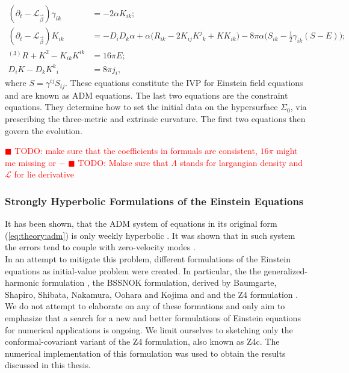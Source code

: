 \documentclass[11pt,a4paper,headinclude=true,DIV=14,BCOR=8mm,chapterprefix,listof=totoc,twoside,openright,abstracton]{scrbook}
\newcommand{\todo}[1]{\textcolor{red}{$\blacksquare$ TODO: #1}}
\begin{document}
\begin{align}
    (\partial_t - \mathcal{L}_{\vec{\beta}})\gamma_{ik} &= -2\alpha K_{ik}; \\
    (\partial_t - \mathcal{L}_{\vec{\beta}})K_{ik} &= -D_{i}D_{k}\alpha + \alpha\big(R_{ik} - 2K_{ij}{K^j}_k+KK_{ik}\big) - 8\pi\alpha\big(S_{ik} - \frac{1}{2}\gamma_{ik}(S-E)\big); \\
    {^{(3)}R} + K^2 - K_{ik}K^{ik} &= 16\pi E; \\
    D_{i}K-D_{k}{K^k}_i &= 8\pi j_i,
    \label{eq:theory:adm}
\end{align}
where $S = \gamma^{ij}S_{ij}$.
These equations constitute the IVP for Einstein field equations and are known as ADM equations. The last two equations are the constraint equations. They determine how to set the initial data on the hypersurface $\Sigma_0$, via prescribing the three-metric and extrinsic curvature. The first two equations then govern the evolution.

\todo{make sure that the coefficients in formuals are consistent, $16\pi$ might me missing or $-$}
\todo{Makse sure that $\Lambda$ stands for largangian density and $\mathcal{L}$ for lie derivative}

\subsubsection{Strongly Hyperbolic Formulations of the Einstein Equations}

It has been shown, that the ADM system of equations in its original form (\ref{eq:theory:adm}) is only weekly hyperbolic \cite{Baumgarte:2002jm}. It was shown that in such system the errors tend to couple with zero-velocity modes \cite{Alcubierre:1999rt}.  \\
In an attempt to mitigate this problem, different formulations of the Einstein equations as initial-value problem were created. In particular, the the generalized-harmonic formulation \cite{Friedrich:1985,Lindblom:2005qh,Lindblom:2009}, the BSSNOK formulation, derived by Baumgarte, Shapiro, Shibata, Nakamura, Oohara and Kojima \cite{Nakamura1987,Shibata:1995we,Baumgarte:1998te} and and the Z4 formulation \cite{Bona:2003fj,Bernuzzi:2009ex,Ruiz:2010qj,Weyhausen:2011cg,Alic:2011gg}. We do not attempt to elaborate on any of these formations and only aim to emphasize that a search for a new and better formulations of Einstein equations for numerical applications is ongoing. We limit ourselves to sketching only the conformal-covariant variant of the Z4 formulation, also known as Z4c. The numerical implementation of this formulation was used to obtain the results discussed in this thesis. 
\end{document}
